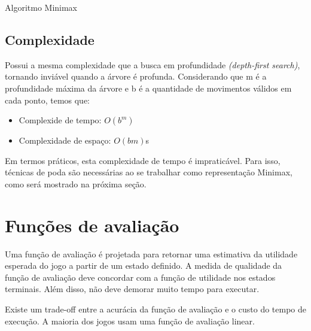 \documentclass[sigplan,screen]{acmart}
\begin{document}
\begin{algorithm}
\DontPrintSemicolon
  \caption{Algoritmo Minimax}
  \label{alg:generator}


\end{algorithm}

\subsection{Complexidade}

Possui a mesma complexidade que a busca em profundidade {\itshape (depth-first search)}, tornando inviável quando a árvore é profunda.
Considerando que m é a profundidade máxima da árvore e b é a quantidade de movimentos válidos em cada ponto, temos que:
\begin{itemize}
  \item Complexide de tempo: $O(b^m)$
  \item Complexidade de espaço: $O(bm)$s
\end{itemize}

Em termos práticos, esta complexidade de tempo é impraticável. Para isso, técnicas de poda são necessárias ao se trabalhar como representação Minimax, como será mostrado na próxima seção.

\section{Funções de avaliação}

Uma função de avaliação é projetada para retornar uma estimativa da utilidade esperada do jogo a partir de um estado definido. 
A medida de qualidade da função de avaliação deve concordar com a função de utilidade nos estados terminais. Além disso, não deve demorar muito tempo para executar.

Existe um trade-off entre a acurácia da função de avaliação e o custo do tempo de execução. 
A maioria dos jogos usam uma função de avaliação linear.
\end{document}
